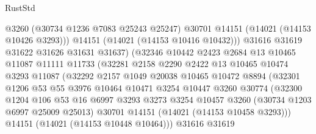 \begin{lexlean}{RustStd}
\begin{coremodule}
                              @3260
                              (@30734 @1236 @7083 @25243 @25247)
                              @30701
                              @14151
                              (@14021 (@14153 @10426 @3293)))
                            @14151
                            (@14021 (@14153 @10416 @10432)))
                          @31616
                          @31619
                          @31622
                          @31626
                          @31631
                          @31637)
                        (@32346
                          @10442
                          @2423
                          @2684
                          @13
                          @10465
                          @11087
                          @11111
                          @11733
                          (@32281
                            @2158
                            @2290
                            @2422
                            @13
                            @10465
                            @10474
                            @3293
                            @11087
                            (@32292
                              @2157
                              @1049
                              @20038
                              @10465
                              @10472
                              @8894
                              (@32301
                                @1206
                                @53
                                @55
                                @3976
                                @10464
                                @10471
                                @3254
                                @10447
                                @3260
                                @30774
                                (@32300
                                  @1204
                                  @106
                                  @53
                                  @16
                                  @6997
                                  @3293
                                  @3273
                                  @3254
                                  @10457
                                  @3260
                                  (@30734 @1203 @6997 @25009 @25013)
                                  @30701
                                  @14151
                                  (@14021 (@14153 @10458 @3293)))
                                @14151
                                (@14021 (@14153 @10448 @10464)))
                              @31616
                              @31619

\end{coremodule}
\end{lexlean}
